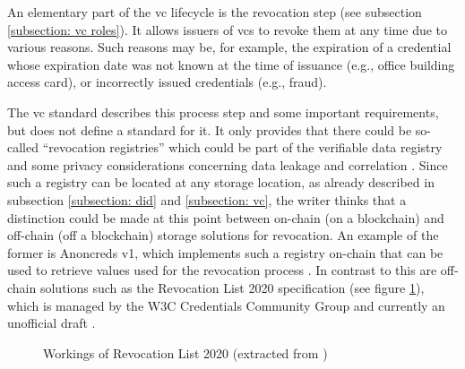 		An elementary part of the \ac{vc} lifecycle is the revocation step (see subsection \ref{subsection: vc roles}). It allows issuers of \acp{vc} to revoke them at any time due to various reasons. Such reasons may be, for example, the expiration of a credential whose expiration date was not known at the time of issuance (e.g., office building access card), or incorrectly issued credentials (e.g., fraud).
		
		The \ac{vc} standard describes this process step and some important requirements, but does not define a standard for it. It only provides that there could be so-called “revocation registries” which could be part of the verifiable data registry and some privacy considerations concerning data leakage and correlation  \cite{sporny_verifiable_2019}.
		Since such a registry can be located at any storage location, as already described in subsection \ref{subsection: did} and \ref{subsection: vc}, the writer thinks that a distinction could be made at this point between on-chain (on a blockchain) and off-chain (off a blockchain) storage solutions for revocation. An example of the former is Anoncreds v1, which implements such a registry on-chain that can be used to retrieve values used for the revocation process \cite{hardman_0011_2018, hyperledger_how_2018}. In contrast to this are off-chain solutions such as the Revocation List 2020 specification (see figure \ref{figure: revocationlist2020}), which is managed by the W3C Credentials Community Group and currently an unofficial draft \cite{longley_revocation_2021}.
		
	    \begin{figure}[htp]
    	    \centering
    	    \makebox[\textwidth]{}
            \caption[Workings of Revocation List 2020]{Workings of Revocation List 2020 (extracted from \cite{longley_revocation_2021})}
            \label{figure: revocationlist2020}
        \end{figure}
        
